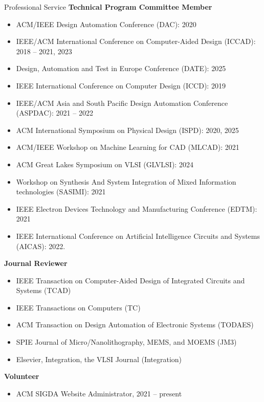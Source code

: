 \begin{rSection}{Professional Service}
\textbf{Technical Program Committee Member}
\begin{itemize}
    \item ACM/IEEE Design Automation Conference (DAC): 2020
    \item IEEE/ACM International Conference on Computer-Aided Design (ICCAD): 2018 -- 2021, 2023
    \item Design, Automation and Test in Europe Conference (DATE): 2025
    \item IEEE International Conference on Computer Design (ICCD): 2019
    \item IEEE/ACM Asia and South Pacific Design Automation Conference (ASPDAC): 2021 -- 2022
    \item ACM International Symposium on Physical Design (ISPD): 2020, 2025
    \item ACM/IEEE Workshop on Machine Learning for CAD (MLCAD): 2021
    \item ACM Great Lakes Symposium on VLSI (GLVLSI): 2024
    \item Workshop on Synthesis And System Integration of Mixed Information technologies (SASIMI): 2021
    \item IEEE Electron Devices Technology and Manufacturing Conference (EDTM): 2021
    \item IEEE International Conference on Artificial Intelligence Circuits and Systems (AICAS): 2022. 
\end{itemize}

\textbf{Journal Reviewer}
\begin{itemize}
    \item IEEE Transaction on Computer-Aided Design of Integrated Circuits and Systems (TCAD)
    \item IEEE Transactions on Computers (TC)
    \item ACM Transaction on Design Automation of Electronic Systems (TODAES)
    \item SPIE Journal of Micro/Nanolithography, MEMS, and MOEMS (JM3)
    \item Elsevier, Integration, the VLSI Journal (Integration)
\end{itemize}

\textbf{Volunteer}
\begin{itemize}
    \item ACM SIGDA Website Administrator, 2021 -- present
\end{itemize}

\end{rSection}

